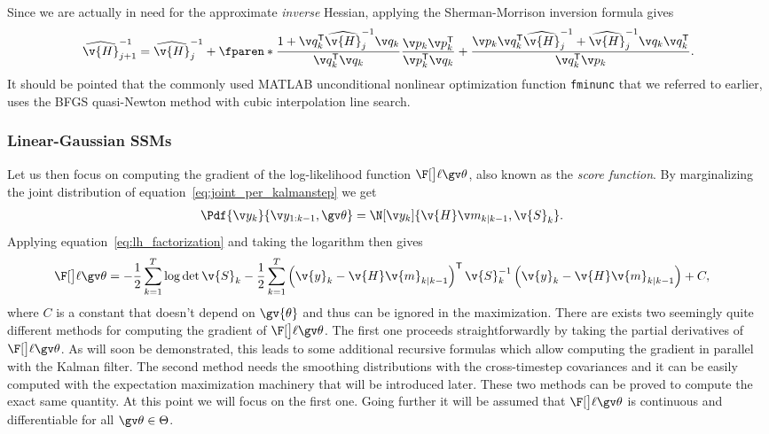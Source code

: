 Since we are actually in need for the approximate \emph{inverse} Hessian,
applying the Sherman-Morrison inversion formula gives
\begin{align}
	\widehat{\v{H}}_{j+1}^{-1}=\widehat{\v{H}}_{j}^{-1}+\fparen*{\frac{1+\q_k^\tr\widehat{\v{H}}_{j}^{-1}\q_k}{\q_k^\tr\q_k}}\frac{\p_k\p_k^\tr}{\p_k^\tr\q_k}+
	\frac{\p_k\q_k^\tr\widehat{\v{H}}^{-1}_{j}+\widehat{\v{H}}^{-1}_{j}\q_k\q_k^\tr}{\q_k^\tr\p_k}.
\end{align}
It should be pointed that the commonly used MATLAB unconditional nonlinear
optimization function \texttt{fminunc} that we referred to earlier, uses 
the BFGS quasi-Newton method with cubic interpolation line search.

\begin{example}
\end{example}

\subsubsection{Linear-Gaussian SSMs}\label{sec:grad_LGSSM}

Let us then focus on computing the gradient of the
log-likelihood function $\lLH$, also known as the \emph{score function}.
By marginalizing the joint distribution of equation~\eqref{eq:joint_per_kalmanstep}
we get 
\begin{align}
	\Pdf{\y_k}{\y_{1:k-1},\Th}&=\N[\yk]{\v{H}\m_{k|k-1},\v{S}_k }.
\end{align}
Applying equation~\eqref{eq:lh_factorization} and taking the logarithm then gives
\begin{align}
	\lLH&=-\frac{1}{2}\sum_{k=1}^T\log\det{\v{S}_k}
	-\frac{1}{2}\sum_{k=1}^T\left(\v{y}_k-\v{H}\v{m}_{k|k-1}\right)^\tr\v{S}_{k}^{-1}\left(\v{y}_k-\v{H}\v{m}_{k|k-1}\right)+C,
	\label{eq:logLH}
\end{align}
where $C$ is a constant that doesn't depend on $\gv{\theta}$ and thus can
be ignored in the maximization.
There are exists two seemingly quite different methods for computing
the gradient of $\lLH$. The first one proceeds straightforwardly by taking the
partial derivatives of $\lLH$. As will soon be demonstrated, this leads
to some additional recursive formulas which allow computing
the gradient in parallel with the Kalman filter. The second method needs
the smoothing distributions with the cross-timestep covariances
and it can be easily computed with the expectation maximization machinery
that will be introduced later. These two methods can be proved to compute
the exact same quantity. At this point we will focus on the first one. Going further
it will be assumed that $\lLH$ is continuous and differentiable for all $\Th\in\Theta$.

